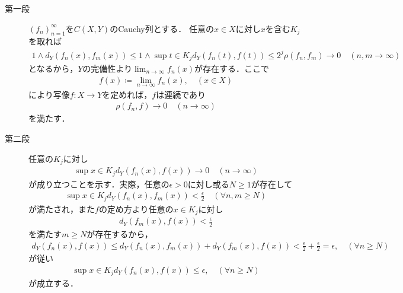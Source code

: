 	\begin{prf}\mbox{}
		\begin{description}
			\item[第一段]
				$(f_n)_{n=1}^\infty$を$C(X,Y)$のCauchy列とする．
				任意の$x \in X$に対し$x$を含む$K_j$を取れば
				\begin{align}
					1 \wedge d_Y(f_n(x),f_m(x)) 
					\leq 1 \wedge \sup{t \in K_j}{d_Y(f_n(t),f(t))}
					\leq 2^j \rho(f_n,f_m) \longrightarrow 0
					\quad (n,m \longrightarrow \infty)
				\end{align}
				となるから，$Y$の完備性より$\lim_{n \to \infty} f_n(x)$が存在する．ここで
				\begin{align}
					f(x) \coloneqq \lim_{n \to \infty} f_n(x), \quad (x \in X)
				\end{align}
				により写像$f:X \longrightarrow Y$を定めれば，$f$は連続であり
				\begin{align}
					\rho(f_n,f) \longrightarrow 0 \quad (n \longrightarrow \infty)
					\label{eq:completeness_and_separability_of_space_of_continuous_functions_3}
				\end{align}
				を満たす．
			
			\item[第二段]
				任意の$K_j$に対し
				\begin{align}
					\sup{x \in K_j}{d_Y(f_n(x),f(x))} \longrightarrow 0
					\quad (n \longrightarrow \infty)
					\label{eq:completeness_and_separability_of_space_of_continuous_functions_4}
				\end{align}
				が成り立つことを示す．実際，任意の$\epsilon > 0$に対し或る$N \geq 1$が存在して
				\begin{align}
					\sup{x \in K_j}{d_Y(f_n(x),f_m(x))} < \frac{\epsilon}{2}
					\quad (\forall n,m \geq N)
				\end{align}
				が満たされ，また$f$の定め方より任意の$x \in K_j$に対し
				\begin{align}
					d_Y(f_m(x),f(x)) < \frac{\epsilon}{2}
				\end{align}
				を満たす$m \geq N$が存在するから，
				\begin{align}
					d_Y(f_n(x),f(x)) \leq d_Y(f_n(x),f_m(x)) + d_Y(f_m(x),f(x)) 
					< \frac{\epsilon}{2} + \frac{\epsilon}{2}
					= \epsilon,
					\quad (\forall n \geq N)
				\end{align}
				が従い
				\begin{align}
					\sup{x \in K_j}{d_Y(f_n(x),f(x))} \leq \epsilon,
					\quad (\forall n \geq N)
				\end{align}
				が成立する．
				

\end{description}
\end{prf}

